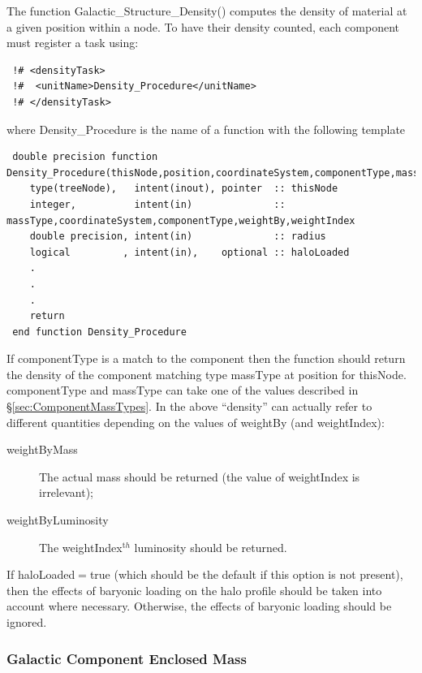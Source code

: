 The function {\normalfont \ttfamily Galactic\_Structure\_Density()} computes the density of material at a given position within a node. To have their density counted, each component must register a task using:
\begin{verbatim}
 !# <densityTask>
 !#  <unitName>Density_Procedure</unitName>
 !# </densityTask>
\end{verbatim}
where {\normalfont \ttfamily Density\_Procedure} is the name of a function with the following template
\begin{verbatim}
 double precision function Density_Procedure(thisNode,position,coordinateSystem,componentType,massType,weightBy,weightIndex,haloLoaded)
    type(treeNode),   intent(inout), pointer  :: thisNode
    integer,          intent(in)              :: massType,coordinateSystem,componentType,weightBy,weightIndex
    double precision, intent(in)              :: radius
    logical         , intent(in),    optional :: haloLoaded
    .
    .
    .
    return
 end function Density_Procedure
\end{verbatim}
If {\normalfont \ttfamily componentType} is a match to the component then the function should return the density of the component matching type {\normalfont \ttfamily massType} at {\normalfont \ttfamily position} for {\normalfont \ttfamily thisNode}. {\normalfont \ttfamily componentType} and {\normalfont \ttfamily massType} can take one of the values described in \S\ref{sec:ComponentMassTypes}. In the above ``density'' can actually refer to different quantities depending on the values of {\normalfont \ttfamily weightBy} (and {\normalfont \ttfamily weightIndex}):
\begin{description}
\item [{\normalfont \ttfamily weightByMass}] The actual mass should be returned (the value of {\normalfont \ttfamily weightIndex} is irrelevant);
\item [{\normalfont \ttfamily weightByLuminosity}] The {\normalfont \ttfamily weightIndex}$^{\mathrm th}$ luminosity should be returned.
\end{description}
If {\normalfont \ttfamily haloLoaded}$=${\normalfont \ttfamily true} (which should be the default if this option is not present), then the effects of baryonic loading on the halo profile should be taken into account where necessary. Otherwise, the effects of baryonic loading should be ignored.

\subsubsection{Galactic Component Enclosed Mass}

